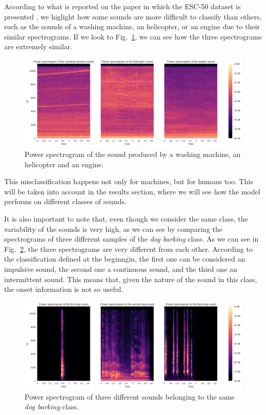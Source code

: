 \documentclass{article}
\begin{document}
\begin{sloppy}
According to what is reported on the paper in which the ESC-50 dataset is presented \cite{piczak2015dataset}, we higlight how some sounds are more difficult to classify than others,
such as the sounds of a washing machine, an helicopter, or an engine due to their similar spectrograms. If we look to Fig.~\ref{fig:Ambiguous_sounds}, we can see how the three spectrograms
are extremely similar.

\begin{figure}[ht]
  \centering
  \centerline{\includegraphics[width=\columnwidth]{Ambiguous_sounds.png}}
  \caption{Power spectrogram of the sound produced by a washing machine, an helicopter and an engine.}
  \label{fig:Ambiguous_sounds}
\end{figure}

This misclassification happens not only for machines, but for humans too. This will be taken into account in the results section, where we will see how the model performs on different classes of sounds.

It is also important to note that, even though we consider the same class, the variability of the sounds is very high, as we can see by comparing the spectrograms of three different
samples of the \textit{dog barking} class. As we can see in Fig.~\ref{fig:Dog_barking}, the three spectrograms are very different from each other. According to the classification defined at the beginngin,
the first one can be considered an impulsive sound, the second one a continuous sound, and the third one an intermittent sound. This means that, given the nature of the sound in this class,
the onset information is not so useful.

\begin{figure}[ht]
  \centering
  \centerline{\includegraphics[width=\columnwidth]{dog_barking.png}}
  \caption{Power spectrogram of three different sounds belonging to the same \textit{dog barking} class.}
  \label{fig:Dog_barking}
\end{figure}


\end{sloppy}
\end{document}
